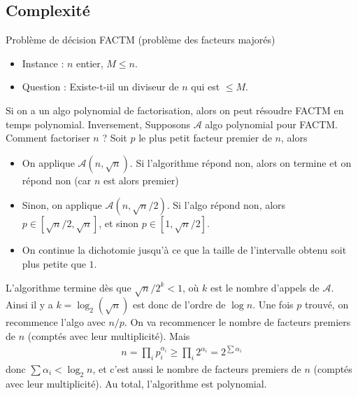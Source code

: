         \subsection{Complexité}
            Problème de décision FACTM (problème des facteurs majorés)
            \begin{itemize}
                \item Instance : $n$ entier, $M \leq n$.
                \item Question : Existe-t-iil un diviseur de $n$ qui est $\leq M$.
            \end{itemize}
            Si on a un algo polynomial de factorisation, alors on peut résoudre FACTM en temps polynomial. Inversement, Supposons $\mathcal{A}$ algo polynomial pour FACTM. Comment factoriser $n$ ? Soit $p$ le plus petit facteur premier de $n$, alors
            \begin{itemize}
                \item On applique $\mathcal{A}(n, \sqrt{n})$. Si l'algorithme répond non, alors on termine et on répond non (car $n$ est alors premier)
                \item Sinon, on applique $\mathcal{A}(n, \sqrt{n}/2)$. Si l'algo répond non, alors $p \in [\sqrt{n}/2, \sqrt{n}]$, et sinon $p \in [1, \sqrt{n}/2]$.
                \item On continue la dichotomie jusqu'à ce que la taille de l'intervalle obtenu soit plus petite que $1$.
            \end{itemize}
            L'algorithme termine dès que $\sqrt{n}/2^k <1$, où $k$ est le nombre d'appels de $\mathcal{A}$. Ainsi il y a $k = \log_2(\sqrt{n})$ est donc de l'ordre de $\log n$. Une fois $p$ trouvé, on recommence l'algo avec $n/p$. On va recommencer le nombre de facteurs premiers de $n$ (comptés avec leur multiplicité). Mais
            \begin{align*}
                n = \prod_i p_i^{\alpha_i} \geq \prod_i 2^{\alpha_i} = 2^{\sum \alpha_i}
            \end{align*}
            donc $\sum \alpha_i < \log_2 n$, et c'est aussi le nombre de facteurs premiers de $n$ (comptés avec leur multiplicité). Au total, l'algorithme est polynomial.

